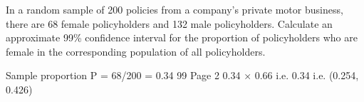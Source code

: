 \documentclass[a4paper,12pt]{article}
\begin{document}
\item In a random sample of 200 policies from a company’s private motor business, there are 68 female policyholders and 132 male policyholders.
Calculate an approximate 99\% confidence interval for the proportion of policyholders who are female in the corresponding population of all policyholders.

\newpage
Sample proportion P = 68/200 = 0.34
99%
Page 2
0.34 × 0.66
i.e. 0.34  i.e. (0.254, 0.426)
\end{document}
